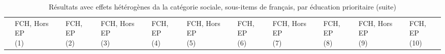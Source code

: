 \documentclass[
]{book}
\begin{document}
\begin{ThreePartTable}
\begin{longtable}[t]{lllllllllll}
\midrule
\endfirsthead
\caption[]{\label{tab:agemodelspcsg2reseaubinsepssitemsfrench}Résultats avec effets hétérogènes da la catégorie sociale, sous-items de français, par éducation prioritaire (suite)}\\
\toprule
 & \makecell{FCH, Hors EP \\ (1) } & \makecell{FCH, EP \\ (2) } & \makecell{FCH, Hors EP \\ (3) } & \makecell{FCH, EP \\ (4) } & \makecell{FCH, Hors EP \\ (5) } & \makecell{FCH, EP \\ (6) } & \makecell{FCH, Hors EP \\ (7) } & \makecell{FCH, EP \\ (8) } & \makecell{FCH, Hors EP \\ (9) } & \makecell{FCH, EP \\ (10) }\\
\midrule
\endhead


\end{longtable}
\end{ThreePartTable}
\end{document}
